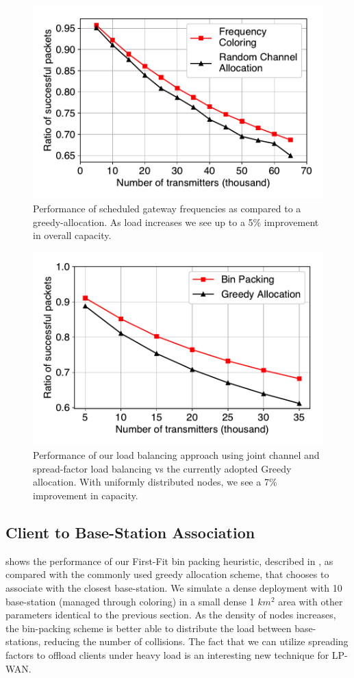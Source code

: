 \begin{figure}[bht]
\centering
\includegraphics[width=0.8\columnwidth]{figures/RandomVsColoring}
\compactimg
\caption{Performance of scheduled gateway frequencies as compared to a greedy-allocation. As load increases we see up to a 5\% improvement in overall capacity.}
\label{fig:coloring}
\compactimg
\end{figure}


\begin{figure}
\includegraphics[width=0.8\columnwidth]{figures/binpacking}
\caption{Performance of our load balancing approach using joint channel and spread-factor load balancing vs the currently adopted Greedy allocation. With uniformly distributed nodes, we see a 7\% improvement in capacity. }
\label{fig:binpacking}
\compactimg
\end{figure}

\subsection{Client to Base-Station Association}
 shows the performance of our First-Fit bin packing heuristic, described in , as compared with the commonly used greedy allocation scheme, that chooses to associate with the closest base-station. We simulate a dense deployment with 10 base-station (managed through coloring) in a small dense 1 $km^2$ area with other parameters identical to the previous section. As the density of nodes increases, the bin-packing scheme is better able to distribute the load between base-stations, reducing the number of collisions. The fact that we can utilize spreading factors to offload clients under heavy load is an interesting new technique for LP-WAN.


